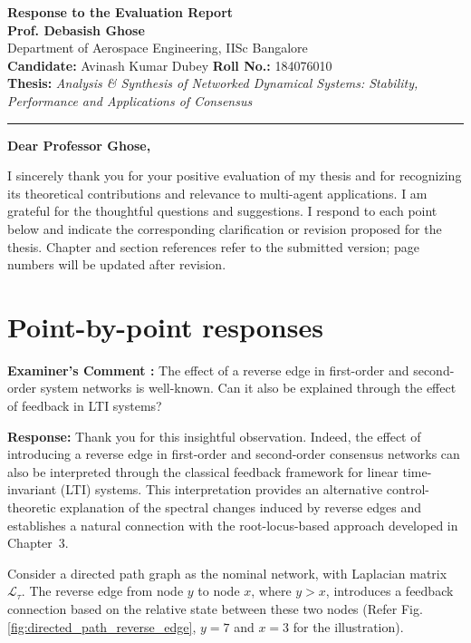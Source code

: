 \documentclass[11pt,a4paper]{article}
\newcounter{examcomment}
\renewcommand{\theexamcomment}{\arabic{examcomment}}
\newcommand{\comment}[1]{%
	\refstepcounter{examcomment}%
	\par\vspace{5pt}\noindent
	\colorbox{gray!13}{%
		\parbox{\dimexpr\linewidth-2\fboxsep}{%
			\textbf{Examiner's Comment \theexamcomment:} #1%
		}%
	}%
	\par
}
\newcommand{\response}{\par\textbf{Response:} }
\begin{document}
\begin{center}
{\Large\bfseries Response to the Evaluation Report}\\[4pt]
{\large\bfseries Prof. Debasish Ghose}\\
Department of Aerospace Engineering, IISc Bangalore\\[8pt]
\textbf{Candidate:} Avinash Kumar Dubey \qquad
\textbf{Roll No.:} 184076010\\
\textbf{Thesis:} \emph{Analysis \& Synthesis of Networked Dynamical Systems: Stability, Performance and Applications of Consensus}
\end{center}
\vspace{4pt}
\hrule
\vspace{8pt}
\textbf{Dear Professor Ghose,}

I sincerely thank you for your positive evaluation of my thesis and for recognizing its theoretical contributions and relevance to multi-agent applications. I am grateful for the thoughtful questions and suggestions. I respond to each point below and indicate the corresponding clarification or revision proposed for the thesis. Chapter and section references refer to the submitted version; page numbers will be updated after revision.

\section*{Point-by-point responses}

\comment{The effect of a reverse edge in first-order and second-order system networks is well-known. Can it also be explained through the effect of feedback in LTI systems?}
\response
Thank you for this insightful observation. Indeed, the effect of introducing a reverse edge in first-order and second-order consensus networks can also be interpreted through the classical feedback framework for linear time-invariant (LTI) systems. This interpretation provides an alternative control-theoretic explanation of the spectral changes induced by reverse edges and establishes a natural connection with the root-locus-based approach developed in Chapter~3.

Consider a directed path graph as the nominal network, with Laplacian matrix $\mathcal{L}_{\tau}$. The reverse edge from node $y$ to node $x$, where $y>x$, introduces a feedback connection based on the relative state between these two nodes (Refer Fig. \ref{fig:directed_path_reverse_edge}, $y=7$ and $x=3$ for the illustration). 
\end{document}
